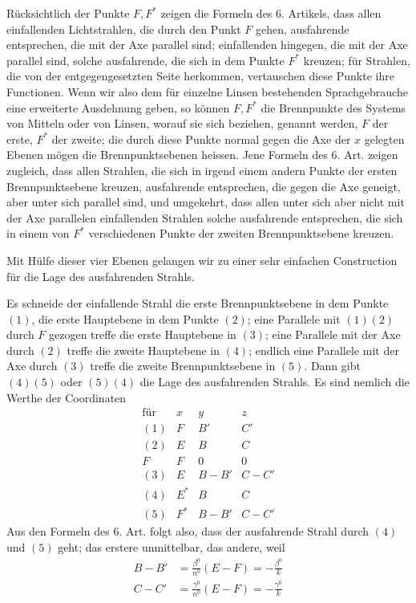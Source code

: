 Rücksichtlich der Punkte $F,F^*$ zeigen die Formeln des 6. Artikels, dass allen einfallenden Lichtstrahlen, die durch den Punkt $F$ gehen, ausfahrende entsprechen, die mit der Axe parallel sind; einfallenden hingegen, die mit der Axe parallel sind, solche ausfahrende, die sich in dem Punkte $F^*$ kreuzen; für
Strahlen, die von der entgegengesetzten Seite herkommen, vertauschen diese Punkte ihre Functionen. Wenn wir also dem für einzelne Linsen bestehenden Sprachgebrauche eine erweiterte Ausdehnung geben, so können $F,F^*$ die Brennpunkte des Systems von Mitteln oder von Linsen, worauf sie sich beziehen, genannt werden, $F$ der erste, $F^*$ der zweite; die durch diese Punkte normal gegen die Axe der $x$ gelegten Ebenen mögen die Brennpunktsebenen heissen. Jene Formeln des 6. Art. zeigen zugleich, dass allen Strahlen, die sich in irgend einem andern Punkte der ersten Brennpunktsebene kreuzen, ausfahrende entsprechen, die gegen die Axe geneigt, aber unter sich parallel sind, und umgekehrt, dass allen unter sich aber nicht mit der Axe parallelen einfallenden Strahlen solche ausfahrende entsprechen, die sich in einem von $F^*$ verschiedenen Punkte der zweiten Brennpunktsebene kreuzen.

Mit Hülfe dieser vier Ebenen gelangen wir zu einer sehr einfachen Construction für die Lage des ausfahrenden Strahls.

Es schneide der einfallende Strahl die erste Brennpunktsebene in dem Punkte $(1)$, die erste Hauptebene in dem Punkte $(2)$; eine Parallele mit $(1)(2)$ durch $F$ gezogen treffe die erste Hauptebene in $(3)$; eine Parallele mit der Axe durch $(2)$ treffe die zweite Hauptebene in $(4)$; endlich eine Parallele mit der Axe durch $(3)$ treffe die zweite Brennpunktsebene in $(5)$. Dann gibt $(4)(5)$ oder $(5)(4)$ die Lage des ausfahrenden Strahls. Es sind nemlich die Werthe der Coordinaten
\[
\renewcommand{\arraystretch}{1.25}
\begin{array}{c||c|c|c}
\text{für}&x&y&z\\\hline
(1)&F&B'&C'\\
(2)&E&B&C\\
F&F&0&0\\
(3)&E&B-B'&C-C'\\
(4)&E^*&B&C\\
(5)&F^*&B-B'&C-C'
\end{array}
\]
Aus den Formeln des 6. Art. folgt also, dass der ausfahrende Strahl durch $(4)$ und $(5)$ geht; das erstere unmittelbar, das andere, weil
\[
\begin{aligned}
B-B'&=\frac{\beta^0}{n^0}(E-F)=-\frac{\beta^0}k\\
C-C'&=\frac{\gamma^0}{n^0}(E-F)=-\frac{\gamma^0}k
\end{aligned}
\]

